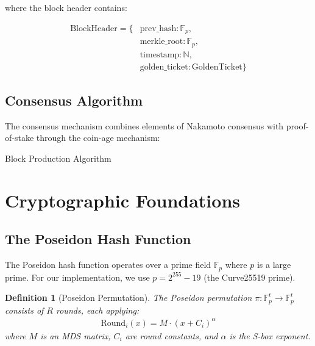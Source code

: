 \documentclass[11pt,a4paper]{article}
\newtheorem{definition}[theorem]{Definition}
\begin{document}
where the block header contains:

\begin{align}
\text{BlockHeader} = \{&\text{prev\_hash}: \mathbb{F}_p,\\
&\text{merkle\_root}: \mathbb{F}_p,\\
&\text{timestamp}: \mathbb{N},\\
&\text{golden\_ticket}: \text{GoldenTicket}\}
\end{align}

\subsection{Consensus Algorithm}

The consensus mechanism combines elements of Nakamoto consensus with proof-of-stake through the coin-age mechanism:

\begin{algorithm}[H]
\SetAlgoLined
{}
\caption{Block Production Algorithm}

\Return{$\perp$}\;
\end{algorithm}

\section{Cryptographic Foundations}

\subsection{The Poseidon Hash Function}

The Poseidon hash function operates over a prime field $\mathbb{F}_p$ where $p$ is a large prime. For our implementation, we use $p = 2^{255} - 19$ (the Curve25519 prime).

\begin{definition}[Poseidon Permutation]
The Poseidon permutation $\pi: \mathbb{F}_p^t \rightarrow \mathbb{F}_p^t$ consists of $R$ rounds, each applying:
\begin{align}
\text{Round}_i(x) = M \cdot (x + C_i)^{\alpha}
\end{align}
where $M$ is an MDS matrix, $C_i$ are round constants, and $\alpha$ is the S-box exponent.
\end{definition}
\end{document}
